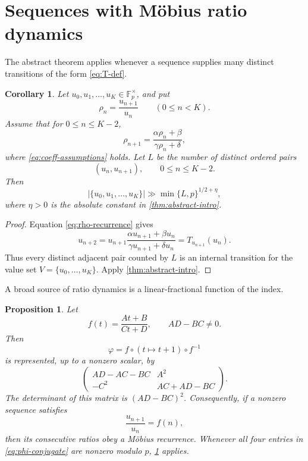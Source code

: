 \documentclass[11pt,reqno]{amsart}
\numberwithin{equation}{section}
\newtheorem{proposition}[proposition]{Proposition}
\newtheorem{corollary}[corollary]{Corollary}
\theoremstyle{definition}
\theoremstyle{remark}
\newcommand{\F}{\mathbb F}
\begin{document}
\section{Sequences with M\"obius ratio dynamics}\label{sec:ratio}

The abstract theorem applies whenever a sequence supplies many distinct transitions of the form \eqref{eq:T-def}.

\begin{corollary}\label{cor:ratio-dynamics}
Let $u_0,u_1,\ldots,u_K\in\F_p^\times$, and put
\[
  \rho_n=\frac{u_{n+1}}{u_n}
  \qquad(0\le n<K).
\]
Assume that for $0\le n\le K-2$,
\begin{equation}\label{eq:rho-recurrence}
  \rho_{n+1}=\frac{\alpha\rho_n+\beta}{\gamma\rho_n+\delta},
\end{equation}
where \eqref{eq:coeff-assumptions} holds.  Let $L$ be the number of distinct ordered pairs
\[
  (u_n,u_{n+1}),
  \qquad 0\le n\le K-2.
\]
Then
\begin{equation}\label{eq:ratio-corollary}
  |\{u_0,u_1,\ldots,u_K\}|
  \gg \min\{L,p\}^{1/2+\eta},
\end{equation}
where $\eta>0$ is the absolute constant in \cref{thm:abstract-intro}.
\end{corollary}

\begin{proof}
Equation \eqref{eq:rho-recurrence} gives
\[
  u_{n+2}
  =u_{n+1}\frac{\alpha u_{n+1}+\beta u_n}
  {\gamma u_{n+1}+\delta u_n}
  =T_{u_{n+1}}(u_n).
\]
Thus every distinct adjacent pair counted by $L$ is an internal transition for the value set $V=\{u_0,\ldots,u_K\}$.  Apply \cref{thm:abstract-intro}.
\end{proof}

A broad source of ratio dynamics is a linear-fractional function of the index.

\begin{proposition}\label{prop:hypergeometric-ratio}
Let
\[
  f(t)=\frac{At+B}{Ct+D},
  \qquad AD-BC\ne0.
\]
Then
\[
  \varphi=f\circ(t\mapsto t+1)\circ f^{-1}
\]
is represented, up to a nonzero scalar, by
\begin{equation}\label{eq:phi-conjugate}
  \begin{pmatrix}
    AD-AC-BC&A^2\\
    -C^2&AC+AD-BC
  \end{pmatrix}.
\end{equation}
The determinant of this matrix is $(AD-BC)^2$.
Consequently, if a nonzero sequence satisfies
\begin{equation}\label{eq:hypergeometric-ratio}
  \frac{u_{n+1}}{u_n}=f(n),
\end{equation}
then its consecutive ratios obey a M\"obius recurrence.  Whenever all four entries in \eqref{eq:phi-conjugate} are nonzero modulo $p$, \cref{cor:ratio-dynamics} applies.
\end{proposition}
\end{document}
